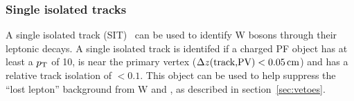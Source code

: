 \subsubsection{Single isolated tracks\label{sec:recSIT}}

A single isolated track (SIT)~\cite{singleleptonstop} can be used to 
identify W bosons through their leptonic decays. A single isolated track 
is identifed if a charged PF object has at least a $p_{\mathrm{T}}$ of 10\gev, 
is near the primary vertex ($\Delta z (\textrm{track,PV}) <0.05\,\text{cm}$) 
and has a relative track isolation of $<0.1$. This object can be
used to help suppress the ``lost lepton'' background from W and
\ttbar, as described in section~\ref{sec:vetoes}. 


